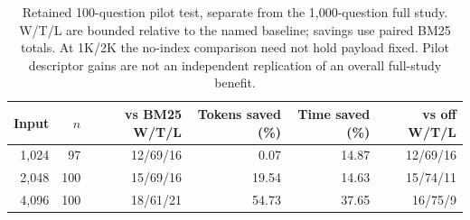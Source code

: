 \begin{table}[htbp]
\centering
\scriptsize
\setlength{\tabcolsep}{4pt}
\caption{Retained 100-question pilot test, separate from the 1,000-question full study. W/T/L are bounded relative to the named baseline; savings use paired BM25 totals. At 1K/2K the no-index comparison need not hold payload fixed. Pilot descriptor gains are not an independent replication of an overall full-study benefit.}
\label{tab:pilot}
\begin{tabular}{rrrrrr}
\toprule
Input & $n$ & vs BM25 W/T/L & Tokens saved (\%) & Time saved (\%) & vs off W/T/L \\
\midrule
1,024 & 97 & 12/69/16 & 0.07 & 14.87 & 12/69/16 \\
2,048 & 100 & 15/69/16 & 19.54 & 14.63 & 15/74/11 \\
4,096 & 100 & 18/61/21 & 54.73 & 37.65 & 16/75/9 \\
\bottomrule
\end{tabular}
\end{table}
